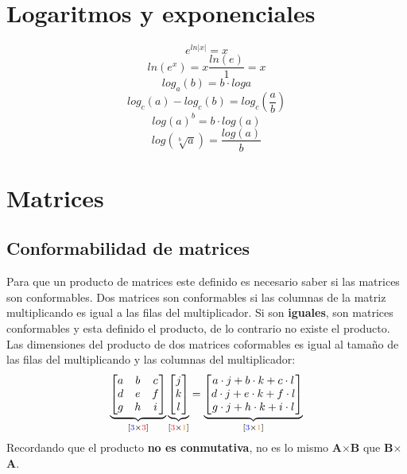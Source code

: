 \documentclass[11pt,fleqn]{book} %
\begin{document}
\section{Logaritmos y exponenciales}
\begin{equation}\label{art:expaln}
e^{ln|x|}=x
\end{equation}
\begin{equation}\label{art:lnaexp}
ln(e^x)=x\frac{ln(e)}{1}=x
\end{equation}
\begin{equation}\label{art:logaritmos}
log_a(b)=b\cdot log a
\end{equation}
\begin{equation}\label{art:logdiv}
log_c(a)-log_c(b)=log_c\left(\frac{a}{b}\right)
\end{equation}
\begin{equation}\label{art:logexp}
log(a)^b=b\cdot log(a)
\end{equation}
\begin{equation}\label{art:raizlog}
log\left(\sqrt[b]{a}\right)=\frac{log(a)}{b}
\end{equation}
\section{Matrices}
\subsection{Conformabilidad de matrices}
Para que un producto de matrices este definido es necesario saber si las matrices son conformables. Dos matrices son conformables si las columnas de la matriz multiplicando es igual a las filas del multiplicador. Si son \textbf{iguales}, son matrices conformables y esta definido el producto, de lo contrario no existe el producto. Las dimensiones del producto de dos matrices coformables es igual al tamaño de las filas del multiplicando y las columnas del multiplicador:
\begin{equation}\label{art:matricesconformables}
   \underbrace{\begin{bmatrix}
     a & b & c\\
     d & e & f\\
     g & h & i
   \end{bmatrix}}_{[\textcolor{blue}{3}\times \textcolor{red}{3}]}
   \underbrace{\begin{bmatrix}j \\k\\l \end{bmatrix}}_{[\textcolor{red}{3}\times \textcolor{orange}{1}]}
   =\underbrace{\begin{bmatrix}a\cdot j+b\cdot k +c\cdot l\\d\cdot j+e\cdot k +f\cdot l\\g\cdot j+h\cdot k +i\cdot l
\end{bmatrix}}_{[\textcolor{blue}{3}\times \textcolor{orange}{1}]}
\end{equation}
Recordando que el producto \textbf{no es conmutativa}, no es lo mismo \textbf{A}$\times$\textbf{B} que \textbf{B}$\times$\textbf{A}.
\end{document}
